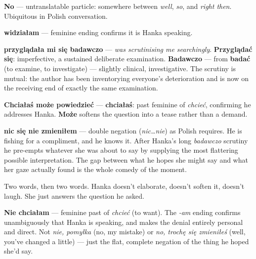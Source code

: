 

\textbf{No} --- untranslatable particle: somewhere between \textit{well}, 
\textit{so}, and \textit{right then}. Ubiquitous in Polish conversation.

\textbf{widziałam} --- feminine ending confirms it is Hanka speaking.

\textbf{przyglądała mi się badawczo} --- \textit{was scrutinising me searchingly}. 
\textbf{Przyglądać się}: imperfective, a sustained deliberate examination. 
\textbf{Badawczo} --- from \textbf{badać} (to examine, to investigate) --- 
slightly clinical, investigative. The scrutiny is mutual: the author has been 
inventorying everyone's deterioration and is now on the receiving end of exactly 
the same examination.



\textbf{Chciałaś może powiedzieć} --- \textbf{chciałaś}: past feminine of 
\textit{chcieć}, confirming he addresses Hanka. \textbf{Może} softens the 
question into a tease rather than a demand.

\textbf{nic się nie zmieniłem} --- double negation (\textit{nic\ldots nie}) 
as Polish requires. He is fishing for a compliment, and he knows it. After 
Hanka's long \textit{badawczo} scrutiny he pre-empts whatever she was about 
to say by supplying the most flattering possible interpretation. The gap 
between what he hopes she might say and what her gaze actually found is 
the whole comedy of the moment.



Two words, then two words. Hanka doesn't elaborate, doesn't soften it,
doesn't laugh. She just answers the question he asked.

\textbf{Nie chciałam} --- feminine past of \textit{chcieć} (to want).
The \textit{-am} ending confirms unambiguously that Hanka is speaking,
and makes the denial entirely personal and direct. Not \textit{nie,
pomyłka} (no, my mistake) or \textit{no, trochę się zmieniłeś} (well,
you've changed a little) --- just the flat, complete negation of the
thing he hoped she'd say.

